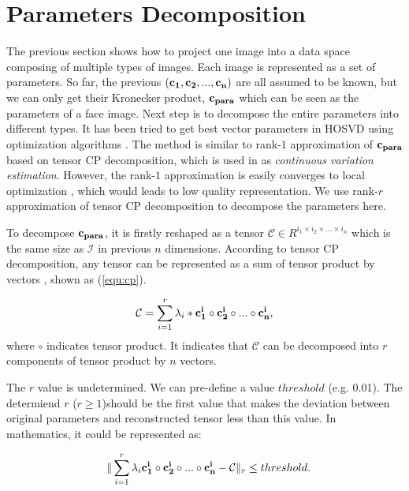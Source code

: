     \section{Parameters Decomposition}

    The previous section shows how to project one image into a data space composing 
    of multiple types of images. Each image is represented as a set of parameters.
    So far, the previous ${\bf (c_1,c_2,...,c_n) }$ are all assumed to be known, but we can only get their
    Kronecker product, ${\bf c_{para} }$ which can be seen as the parameters of a face image. Next step is to
    decompose the entire parameters into different types. It has been tried to get best vector parameters in 
    HOSVD using optimization algorithms \cite{lin05}. The method is similar to rank-$1$ approximation of 
    ${\bf c_{para} }$ based on tensor CP decomposition, which is used in \cite{TPAMI09} as {\it continuous variation 
    estimation}. However, the rank-$1$ approximation is easily converges to local optimization \cite{Lathauwer_rank}, 
    which would leads to low quality representation. We use rank-$r$ approximation of tensor CP decomposition
    to decompose the parameters here. 

    To decompose ${\bf c_{para} }$, it is firstly reshaped as a tensor $\mathcal{C} \in R^{i_1 \times i_2 
    \times ... \times i_n}$ which is the same size as $\mathcal{I}$ in previous $n$ dimensions. According
    to tensor CP decomposition, any 
    tensor can be represented as a sum of tensor product by vectors \cite{Lathauwer_rank}, shown as 
    (\ref{equ:cp}).

    \begin{equation}
      \label{equ:cp_no}
      \begin{aligned}
        \mathcal{C} = \sum_{i=1}^{r}\lambda_i * {\bf c_1^i} \circ {\bf c_2^i} \circ...\circ {\bf c_n^i},  
      \end{aligned}
    \end{equation}
    where $\circ$ indicates tensor product. It indicates that $\mathcal{C}$ can be decomposed into $r$ components 
    of tensor product by $n$ vectors.

    The $r$ value is undetermined. We can pre-define a value $threshold$ (e.g. 0.01). The determiend $r$
    ($r \geq 1$)should be the first value that makes the deviation between original parameters and reconstructed 
    tensor less than this value.
    In mathematics, it could be represented as:
    
    \begin{equation}
      \begin{aligned}
         \ \ \| \sum_{i=1}^{r}\lambda_i {\bf c_{1}^i} \circ {\bf c_{2}^i} \circ ... \circ {\bf c_{n}^i} - \mathcal{C} \|_r \leq threshold.
      \end{aligned}
    \end{equation}

